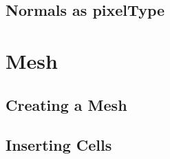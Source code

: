 


\subsection{Normals as pixelType}
\label{sec:PointSetWithCovariantVectorsAsPixelType}






\section{Mesh}\label{MeshSection}

\subsection{Creating a Mesh}
\label{sec:CreatingAMesh}




\subsection{Inserting Cells}
\label{sec:InsertingCellsInMesh}





